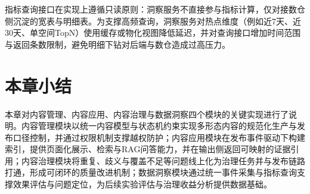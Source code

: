 指标查询接口在实现上遵循只读原则：洞察服务不直接参与指标计算，仅对接数仓侧沉淀的宽表与明细表。为支撑高频查询，洞察服务对热点维度（例如近7天、近30天、单空间TopN）使用缓存或物化视图降低延迟，并对查询接口增加时间范围与返回条数限制，避免明细下钻对后端与数仓造成过高压力。

\section{本章小结}
本章对内容管理、内容应用、内容治理与数据洞察四个模块的关键实现进行了说明。内容管理模块以统一内容模型与状态机约束实现多形态内容的规范化生产与发布口径控制，并通过权限机制支撑越权防护；内容应用模块在发布事件驱动下构建索引，提供页面化展示、检索与RAG问答能力，并在输出侧返回可映射的证据引用；内容治理模块将重复、歧义与覆盖不足等问题线上化为治理任务并与发布链路打通，形成可闭环的质量改进机制；数据洞察模块通过统一事件采集与指标查询支撑效果评估与问题定位，为后续实验评估与治理收益分析提供数据基础。
